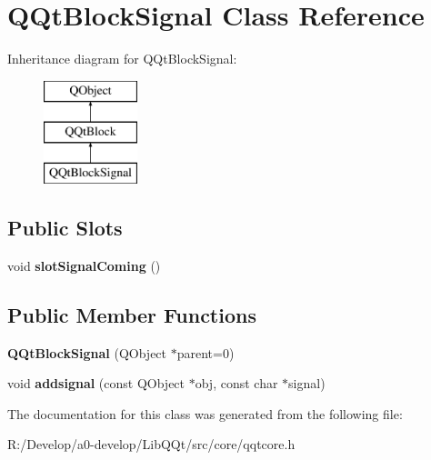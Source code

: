 \hypertarget{class_q_qt_block_signal}{}\section{Q\+Qt\+Block\+Signal Class Reference}
\label{class_q_qt_block_signal}
Inheritance diagram for Q\+Qt\+Block\+Signal\+:\begin{figure}[H]
\begin{center}
\leavevmode
\includegraphics[height=3.000000cm]{class_q_qt_block_signal}
\end{center}
\end{figure}
\subsection*{Public Slots}
\begin{DoxyCompactItemize}
\item 
\mbox{\label{class_q_qt_block_signal_a944df5b69075bb856593b69f5d4be500}} 
void {\bfseries slot\+Signal\+Coming} ()
\end{DoxyCompactItemize}
\subsection*{Public Member Functions}
\begin{DoxyCompactItemize}
\item 
\mbox{\label{class_q_qt_block_signal_a70234f402df39fad8dcdb3aba88d0607}} 
{\bfseries Q\+Qt\+Block\+Signal} (Q\+Object $\ast$parent=0)
\item 
\mbox{\label{class_q_qt_block_signal_a433425abe588e4e70ac373e0fcaa06cf}} 
void {\bfseries addsignal} (const Q\+Object $\ast$obj, const char $\ast$signal)
\end{DoxyCompactItemize}


The documentation for this class was generated from the following file\+:\begin{DoxyCompactItemize}
\item 
R\+:/\+Develop/a0-\/develop/\+Lib\+Q\+Qt/src/core/qqtcore.\+h\end{DoxyCompactItemize}
